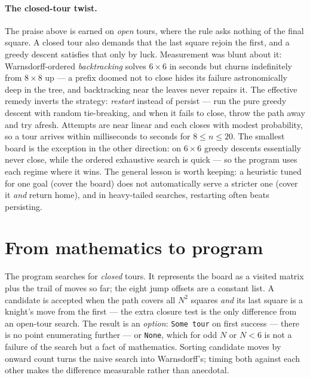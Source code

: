 \documentclass[11pt]{article}
\begin{document}
\paragraph{The closed-tour twist.}
The praise above is earned on \emph{open} tours, where the rule asks
nothing of the final square. A closed tour also demands that the last
square rejoin the first, and a greedy descent satisfies that only by luck.
Measurement was blunt about it: Warnsdorff-ordered \emph{backtracking}
solves $6 \times 6$ in seconds but churns indefinitely from $8 \times 8$
up --- a prefix doomed not to close hides its failure astronomically deep
in the tree, and backtracking near the leaves never repairs it. The
effective remedy inverts the strategy: \emph{restart} instead of persist
--- run the pure greedy descent with random tie-breaking, and when it
fails to close, throw the path away and try afresh. Attempts are near
linear and each closes with modest probability, so a tour arrives within
milliseconds to seconds for $8 \leq n \leq 20$. The smallest board is the
exception in the other direction: on $6 \times 6$ greedy descents
essentially never close, while the ordered exhaustive search is quick ---
so the program uses each regime where it wins. The general lesson is
worth keeping: a heuristic tuned for one goal (cover the board) does not
automatically serve a stricter one (cover it \emph{and} return home), and
in heavy-tailed searches, restarting often beats persisting.

\section{From mathematics to program}

The program searches for \emph{closed} tours. It represents the board as a
visited matrix plus the trail of moves so far; the eight jump offsets are a
constant list. A candidate is accepted when the path covers all $N^2$
squares \emph{and} its last square is a knight's move from the first ---
the extra closure test is the only difference from an open-tour search.
The result is an \emph{option}: \texttt{Some tour} on first success ---
there is no point enumerating further --- or \texttt{None}, which for odd
$N$ or $N < 6$ is not a failure of the search but a fact of mathematics.
Sorting candidate moves by onward count turns the naive search into
Warnsdorff's; timing both against each other makes the difference
measurable rather than anecdotal.
\end{document}
